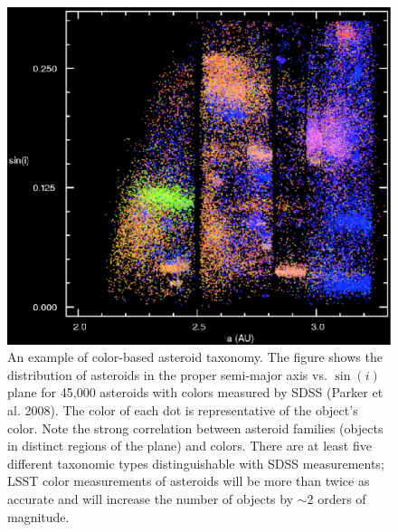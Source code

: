 \documentclass{emulateapj}
\begin{document}
\begin{figure}
\includegraphics[width=1.0\hsize,clip]{asteroids.ps}
\caption{An example of color-based asteroid taxonomy. The figure
shows the distribution of asteroids in the proper semi-major axis vs. $\sin(i)$
plane for 45,000 asteroids with colors measured by SDSS (Parker et al. 2008). 
The color of each dot is representative of the object's color.
Note the strong correlation between asteroid families (objects in distinct regions
of the plane) and colors. There are
at least five different taxonomic types distinguishable with SDSS measurements;
LSST color measurements of asteroids will be more than twice as accurate
and will increase the number of objects by $\sim$2 orders of magnitude.} 
\label{Fig:asteroids}
\end{figure}
\end{document}
